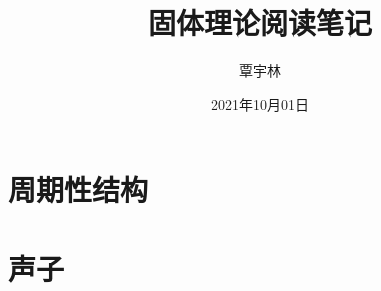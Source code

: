 








\setlength{\droptitle}{-2cm}
\pretitle{\begin{center}\LARGE\sffamily}
\title{固体理论阅读笔记}
\posttitle{\par\end{center}\vspace{-0.3cm}}
\preauthor{\large}
\DeclareRobustCommand{\authorthing}
{
\begin{center}
\begin{tabular}{c}%
覃宇林\\
\end{tabular}
\end{center}
}
\author{\authorthing}
\postauthor{}
\predate{\begin{center}\large\scshape}
\date{2021年10月01日}
\postdate{\par\end{center}}


\frontpagestyle
\maketitle
{}
\tableofcontents\newpage
{}
\mainpagestyle
\setcounter{page}{1}

\section{周期性结构}


\section{声子}



